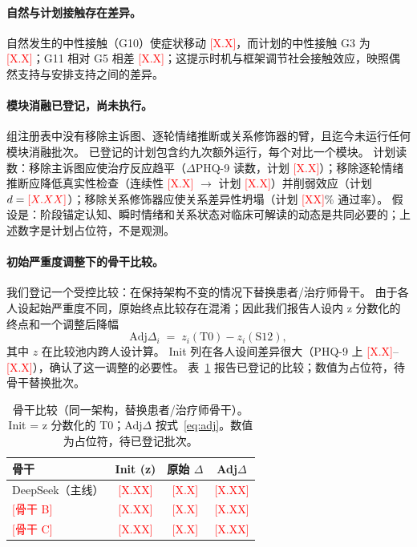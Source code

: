 \documentclass[11pt,a4paper]{article}
\newcommand{\ph}[1]{\textcolor{red}{[#1]}}
\begin{document}
\paragraph{自然与计划接触存在差异。}
自然发生的中性接触（G10）使症状移动 \ph{X.X}，而计划的中性接触 G3 为 \ph{X.X}；G11 相对 G5 相差 \ph{X.X}；这提示时机与框架调节社会接触效应，映照偶然支持与安排支持之间的差异。

\paragraph{模块消融已登记，尚未执行。}
组注册表中没有移除主诉图、逐轮情绪推断或关系修饰器的臂，且迄今未运行任何模块消融批次。
已登记的计划包含约九次额外运行，每个对比一个模块。
计划读数：移除主诉图应使治疗反应趋平（$\Delta$PHQ-9 读数，计划 \ph{X.X}）；移除逐轮情绪推断应降低真实性检查（连续性 \ph{X.X} $\rightarrow$ 计划 \ph{X.X}）并削弱效应（计划 $d = \ph{X.XX}$）；移除关系修饰器应使关系差异性坍塌（计划 \ph{XX}\% 通过率）。
假设是：阶段锚定认知、瞬时情绪和关系状态对临床可解读的动态是共同必要的；上述数字是计划占位符，不是观测。

\paragraph{初始严重度调整下的骨干比较。}
我们登记一个受控比较：在保持架构不变的情况下替换患者/治疗师骨干。
由于各人设起始严重度不同，原始终点比较存在混淆；因此我们报告人设内 z 分数化的终点和一个调整后降幅
\begin{equation}\label{eq:adj}
\mathrm{Adj}\Delta_i \;=\; z_i(\mathrm{T0}) - z_i(\mathrm{S12}),
\end{equation}
其中 $z$ 在比较池内跨人设计算。
Init 列在各人设间差异很大（PHQ-9 上 \ph{X.X}--\ph{X.X}），确认了这一调整的必要性。
表~\ref{tab:backbone} 报告已登记的比较；数值为占位符，待骨干替换批次。

\begin{table}[h]
\centering
\caption{骨干比较（同一架构，替换患者/治疗师骨干）。Init = z 分数化的 T0；Adj$\Delta$ 按式~\ref{eq:adj}。数值为占位符，待已登记批次。}
\label{tab:backbone}
\small
\begin{tabular}{@{}lccc@{}}
\toprule
骨干 & Init (z) & 原始 $\Delta$ & Adj$\Delta$ \\
\midrule
DeepSeek（主线） & \ph{X.XX} & \ph{X.X} & \ph{X.XX} \\
\ph{骨干 B} & \ph{X.XX} & \ph{X.X} & \ph{X.XX} \\
\ph{骨干 C} & \ph{X.XX} & \ph{X.X} & \ph{X.XX} \\
\bottomrule
\end{tabular}
\end{table}
\end{document}
